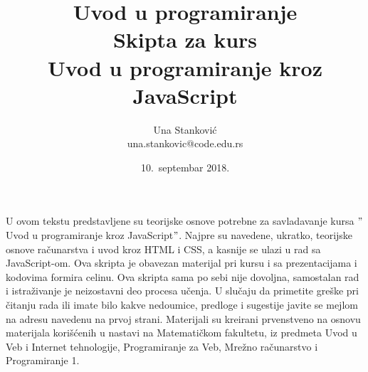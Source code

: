 \documentclass[a4paper]{article}
\begin{document}
\title{Uvod u programiranje\\ \small{Skipta za kurs\\Uvod u programiranje kroz JavaScript\\}}

\author{Una Stanković\\ una.stankovic@code.edu.rs}
\date{10.~septembar 2018.}
\maketitle
\newpage

U ovom tekstu predstavljene su teorijske osnove potrebne za savladavanje kursa $"$ Uvod u programiranje kroz JavaScript$"$. Najpre su navedene, ukratko, teorijske osnove računarstva i uvod kroz HTML i CSS, a kasnije se ulazi u rad sa JavaScript-om.  Ova skripta je obavezan materijal pri kursu i sa prezentacijama i kodovima formira celinu. Ova skripta sama po sebi nije dovoljna, samostalan rad i istraživanje je neizostavni deo procesa učenja. U slučaju da primetite greške pri čitanju rada ili imate bilo kakve nedoumice, predloge i sugestije javite se mejlom na adresu navedenu na prvoj strani. Materijali su kreirani prvenstveno na osnovu materijala korišćenih u nastavi na Matematičkom fakultetu, iz predmeta Uvod u Veb i Internet tehnologije, Programiranje za Veb, Mrežno računarstvo i Programiranje 1.  
\newpage

\tableofcontents

\newpage
\end{document}

